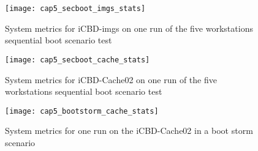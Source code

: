 \begin{figure}[htbp]
	\centering
	\texttt{[image: cap5\_secboot\_imgs\_stats]}
	\caption{System metrics for iCBD-imgs on one run of the five workstations sequential boot scenario test}
	\label{fig:boot_imgs_stats}
\end{figure}


\begin{figure}[htbp]
	\centering
	\texttt{[image: cap5\_secboot\_cache\_stats]}
	\caption{System metrics for iCBD-Cache02 on one run of the five workstations sequential boot scenario test}
	\label{fig:boot_cache_stats}
\end{figure}


\begin{figure}[htbp]
	\centering
	\texttt{[image: cap5\_bootstorm\_cache\_stats]}
	\caption{System metrics for one run on the iCBD-Cache02 in a boot storm scenario}
	\label{fig:boot_cache_stats}
\end{figure}


